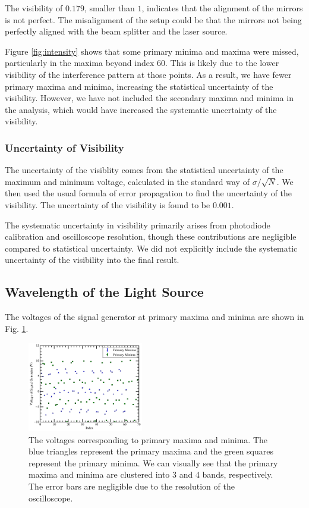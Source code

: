 The visibility of $0.179$, smaller than $1$, indicates that the alignment of the mirrors is not perfect. The misalignment of the setup could be that the mirrors not being perfectly aligned with the beam splitter and the laser source.

Figure \ref{fig:intensity} shows that some primary minima and maxima were missed, particularly in the maxima beyond index 60. This is likely due to the lower visibility of the interference pattern at those points. As a result, we have fewer primary maxima and minima, increasing the statistical uncertainty of the visibility. However, we have not included the secondary maxima and minima in the analysis, which would have increased the systematic uncertainty of the visibility. 


\subsubsection{Uncertainty of Visibility}
The uncertainty of the visiblity comes from the statistical uncertainty of the maximum and minimum voltage, calculated in the standard way of $\sigma/\sqrt{N}$. We then used the usual formula of error propagation to find the uncertainty of the visibility. The uncertainty of the visibility is found to be $0.001$. 

The systematic uncertainty in visibility primarily arises from photodiode calibration and oscilloscope resolution, though these contributions are negligible compared to statistical uncertainty. We did not explicitly include the systematic uncertainty of the visibility into the final result.

\subsection{Wavelength of the Light Source}
The voltages of the signal generator at primary maxima and minima are shown in Fig. \ref{fig:data}. 
\begin{figure}[h]
    \centering
    \includegraphics[width=0.45\textwidth]{fig/Primary_Maxima_Minima.png}
    \caption{The voltages corresponding to primary maxima and minima. The blue triangles represent the primary maxima and the green squares represent the primary minima. We can visually see that the primary maxima and minima are clustered into 3 and 4 bands, respectively. The error bars are negligible due to the resolution of the oscilloscope.}
    \label{fig:data}
\end{figure}

